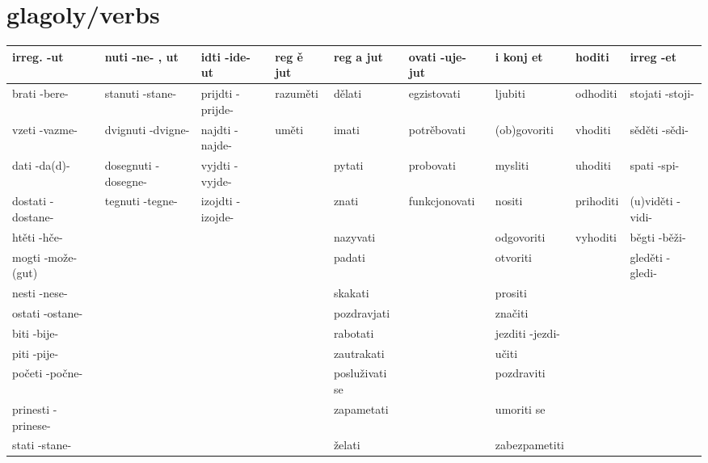 \documentclass{article}
\begin{document}

\noindent
\begin{sidewaystable}
\section*{glagoly/verbs}
\begin{tabularx}{\linewidth}{|*{9}{>{\raggedright\arraybackslash}X|}}
\hline
\cellcolor{myyellow}irreg. -ut & 
\cellcolor{myyellow}nuti -ne- , ut & 
\cellcolor{myyellow}idti -ide- ut & 
\cellcolor{myyellow}reg ě jut & 
\cellcolor{mygreen}reg a jut & 
\cellcolor{myothergreen}ovati -uje- jut & 
\cellcolor{myblue}i konj et & 
\cellcolor{myblue}hoditi & 
\cellcolor{myblue}irreg -et \\
\hline
brati -bere- & stanuti -stane- & prijdti -prijde- & razuměti & dělati & egzistovati & ljubiti & odhoditi & stojati -stoji- \\
\hline
vzeti -vazme- & dvignuti -dvigne- & najdti -najde- & uměti & imati & potrěbovati & (ob)govoriti & vhoditi & sěděti -sědi- \\
\hline
dati -da(d)- & dosegnuti -dosegne- & vyjdti -vyjde- & & pytati & probovati & mysliti & uhoditi & spati -spi- \\
\hline
dostati -dostane- & tegnuti -tegne- & izojdti -izojde- & & znati & funkcjonovati & nositi & prihoditi & (u)viděti -vidi- \\
\hline
htěti -hče- & & & & nazyvati & & odgovoriti & vyhoditi & běgti -běži- \\
\hline
mogti -može- (gut) & & & & padati & & otvoriti & & gleděti -gledi- \\
\hline
nesti -nese- & & & & skakati & & prositi & & \\
\hline
ostati -ostane- & & & & pozdravjati & & značiti & & \\
\hline
biti -bije- & & & & rabotati & & jezditi -jezdi- & & \\
\hline
piti -pije- & & & & zautrakati & & učiti & & \\
\hline
početi -počne- & & & & posluživati se & & pozdraviti & & \\
\hline
prinesti -prinese- & & & & zapametati & & umoriti se & & \\
\hline
stati -stane- & & & & želati & & zabezpametiti & & \\

\end{tabularx}
\end{sidewaystable}
\end{document}
